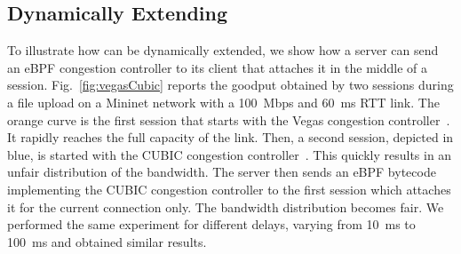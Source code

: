\subsection{Dynamically Extending \tcpls}
%

To illustrate how \tcpls can be dynamically extended, we show how a server can
send an eBPF congestion controller to its client that attaches it in the middle
of a \tcpls session. Fig.~\ref{fig:vegasCubic} reports the goodput obtained
by two \tcpls sessions during a file upload on a Mininet network with a
100~Mbps and 60~ms RTT link.
The orange curve is the first \tcpls session that starts with the Vegas
congestion controller~\cite{brakmo1994tcp}. It rapidly reaches the full capacity of the link. Then, a second \tcpls session, depicted in blue, is
started with the CUBIC congestion controller~\cite{rfc8312}. This quickly
results in an unfair distribution of the bandwidth. The server then sends an
eBPF bytecode implementing the CUBIC congestion controller to the first \tcpls
session which attaches it for the current connection only. The bandwidth distribution becomes fair. We
performed the same experiment for different delays, varying from 10~ms to 100~ms
and obtained similar results.

